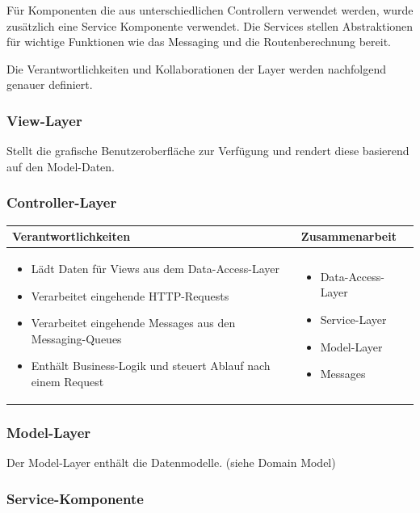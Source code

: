Für Komponenten die aus unterschiedlichen Controllern verwendet werden, wurde zusätzlich eine Service Komponente verwendet. Die Services stellen Abstraktionen für wichtige Funktionen wie das Messaging und die Routenberechnung bereit.

Die Verantwortlichkeiten und Kollaborationen der Layer werden nachfolgend genauer definiert.

\subsubsection{View-Layer}
Stellt die grafische Benutzeroberfläche zur Verfügung und rendert diese basierend auf den Model-Daten.

\subsubsection{Controller-Layer}
\begin{tabular}{|p{}|p{}|} \hline
	\textbf{Verantwortlichkeiten} & \textbf{Zusammenarbeit} \\ \hline \hline
	\begin{itemize}
		\item Lädt Daten für Views aus dem Data-Access-Layer
		\item Verarbeitet eingehende HTTP-Requests
		\item Verarbeitet eingehende Messages aus den Messaging-Queues
		\item Enthält Business-Logik und steuert Ablauf nach einem Request	
	\end{itemize}&
	\begin{itemize}
		\item Data-Access-Layer
		\item Service-Layer
		\item Model-Layer
		\item Messages
	\end{itemize}
	\\ \hline
\end{tabular}

\subsubsection{Model-Layer}

Der Model-Layer enthält die Datenmodelle. (siehe Domain Model)

\subsubsection{Service-Komponente}

